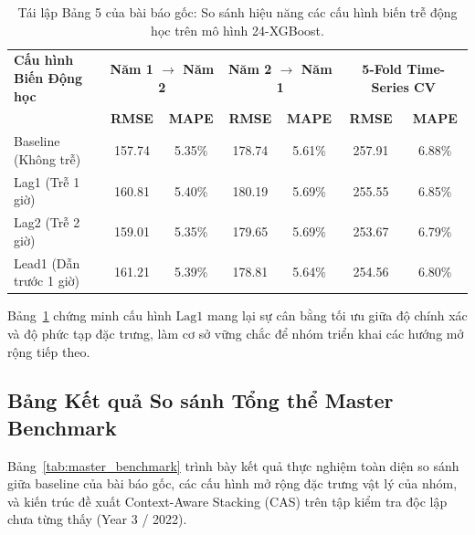 \begin{table}[htbp]
    \centering
    \small
    \caption{Tái lập Bảng 5 của bài báo gốc: So sánh hiệu năng các cấu hình biến trễ động học trên mô hình 24-XGBoost.}
    \label{tab:replicated_table5}
    \begin{tabular}{lcccccc}
        \toprule
        \textbf{Cấu hình Biến Động học} & \multicolumn{2}{c}{\textbf{Năm 1 $\to$ Năm 2}} & \multicolumn{2}{c}{\textbf{Năm 2 $\to$ Năm 1}} & \multicolumn{2}{c}{\textbf{5-Fold Time-Series CV}} \\
        & \textbf{RMSE} & \textbf{MAPE} & \textbf{RMSE} & \textbf{MAPE} & \textbf{RMSE} & \textbf{MAPE} \\
        \midrule
        Baseline (Không trễ) & 157.74 & 5.35\% & 178.74 & 5.61\% & 257.91 & 6.88\% \\
        Lag1 (Trễ 1 giờ)      & 160.81 & 5.40\% & 180.19 & 5.69\% & 255.55 & 6.85\% \\
        Lag2 (Trễ 2 giờ)      & 159.01 & 5.35\% & 179.65 & 5.69\% & 253.67 & 6.79\% \\
        Lead1 (Dẫn trước 1 giờ) & 161.21 & 5.39\% & 178.81 & 5.64\% & 254.56 & 6.80\% \\
        \bottomrule
    \end{tabular}
\end{table}

Bảng~\ref{tab:replicated_table5} chứng minh cấu hình $\text{Lag1}$ mang lại sự cân bằng tối ưu giữa độ chính xác và độ phức tạp đặc trưng, làm cơ sở vững chắc để nhóm triển khai các hướng mở rộng tiếp theo.

\subsection{Bảng Kết quả So sánh Tổng thể Master Benchmark}
Bảng~\ref{tab:master_benchmark} trình bày kết quả thực nghiệm toàn diện so sánh giữa baseline của bài báo gốc, các cấu hình mở rộng đặc trưng vật lý của nhóm, và kiến trúc đề xuất Context-Aware Stacking (CAS) trên tập kiểm tra độc lập chưa từng thấy (Year 3 / 2022).

